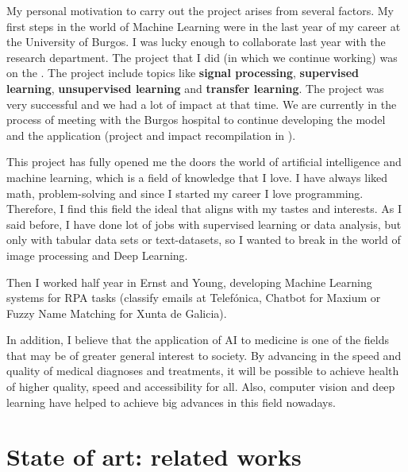 My personal motivation to carry out the project arises from several factors. My first steps in the world of Machine Learning were in the last year of my career at the University of Burgos. I was lucky enough to collaborate last year with the  research department. The project that I did (in which we continue working) was on the . The project include topics like \textbf{signal processing}, \textbf{supervised learning}, \textbf{unsupervised learning} and \textbf{transfer learning}. The project was very successful and we had a lot of impact at that time. We are currently in the process of meeting with the Burgos hospital to continue developing the model and the application (project and impact recompilation in ).

This project has fully opened me the doors the world of artificial intelligence and machine learning, which is a field of knowledge that I love. I have always liked math, problem-solving and since I started my career I love programming. Therefore, I find this field the ideal that aligns with my tastes and interests. As I said before, I have done lot of jobs with supervised learning or data analysis, but only with tabular data sets or text-datasets, so I wanted to break in the world of image processing and Deep Learning.

Then I worked half year in Ernst and Young, developing Machine Learning systems for RPA tasks (classify emails at Telefónica, Chatbot for Maxium or Fuzzy Name Matching for Xunta de Galicia).

In addition, I believe that the application of AI to medicine is one of the fields that may be of greater general interest to society. By advancing in the speed and quality of medical diagnoses and treatments, it will be possible to achieve health of higher quality, speed and accessibility for all. Also, computer vision and deep learning have helped to achieve big advances in this field nowadays. 


\section{State of art: related works}
\textit{}

